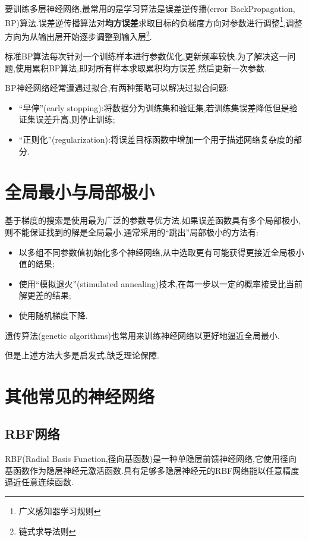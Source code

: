 要训练多层神经网络,最常用的是学习算法是误差逆传播(error BackPropagation, BP)算法.误差逆传播算法对\textbf{均方误差}求取目标的负梯度方向对参数进行调整\footnote{广义感知器学习规则},调整方向为从输出层开始逐步调整到输入层\footnote{链式求导法则}.

标准BP算法每次针对一个训练样本进行参数优化,更新频率较快.为了解决这一问题,使用累积BP算法,即对所有样本求取累积均方误差,然后更新一次参数.

BP神经网络经常遭遇过拟合,有两种策略可以解决过拟合问题:

\begin{itemize}
\item ``早停''(early stopping):将数据分为训练集和验证集,若训练集误差降低但是验证集误差升高,则停止训练;
\item ``正则化''(regularization):将误差目标函数中增加一个用于描述网络复杂度的部分.
\end{itemize}

\section{全局最小与局部极小}

基于梯度的搜索是使用最为广泛的参数寻优方法.如果误差函数具有多个局部极小,则不能保证找到的解是全局最小.通常采用的``跳出''局部极小的方法有:

\begin{itemize}
\item 以多组不同参数值初始化多个神经网络,从中选取更有可能获得更接近全局极小值的结果;
\item 使用``模拟退火''(stimulated annealing)技术,在每一步以一定的概率接受比当前解更差的结果;
\item 使用随机梯度下降.
\end{itemize}

遗传算法(genetic algorithms)也常用来训练神经网络以更好地逼近全局最小.

但是上述方法大多是启发式,缺乏理论保障.

\section{其他常见的神经网络}

\subsection{RBF网络}

RBF(Radial Basis Function,径向基函数)是一种单隐层前馈神经网络,它使用径向基函数作为隐层神经元激活函数.具有足够多隐层神经元的RBF网络能以任意精度逼近任意连续函数.

